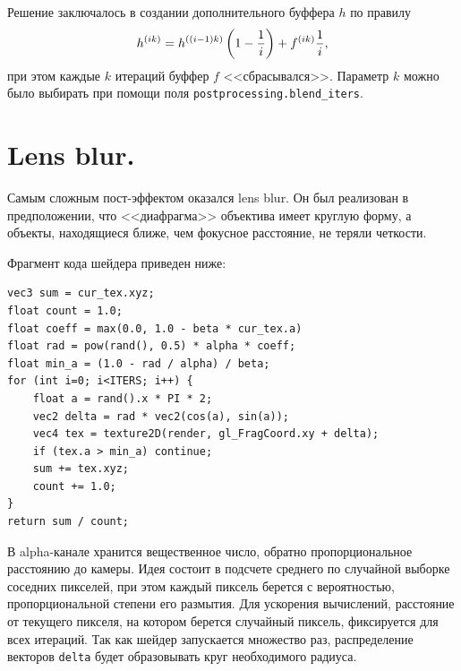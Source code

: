 Решение заключалось в создании дополнительного буффера $h$ по правилу
$$h^{(ik)} = h^{((i - 1)k)} \left(1 - \frac{1}{i}\right) + f^{(ik)}\frac{1}{i},$$
при этом каждые $k$ итераций буффер $f$ <<сбрасывался>>.
Параметр $k$ можно было выбирать при помощи поля \texttt{postprocessing.blend\_iters}.

\section{Lens blur.}

Самым сложным пост-эффектом оказался lens blur. Он был реализован в предположении, что <<диафрагма>> объектива имеет круглую форму, а объекты, находящиеся ближе, чем фокусное расстояние, не теряли четкости.

Фрагмент кода шейдера приведен ниже:
\begin{verbatim}
vec3 sum = cur_tex.xyz;
float count = 1.0;
float coeff = max(0.0, 1.0 - beta * cur_tex.a)
float rad = pow(rand(), 0.5) * alpha * coeff;
float min_a = (1.0 - rad / alpha) / beta;
for (int i=0; i<ITERS; i++) {
    float a = rand().x * PI * 2;
    vec2 delta = rad * vec2(cos(a), sin(a));
    vec4 tex = texture2D(render, gl_FragCoord.xy + delta);
    if (tex.a > min_a) continue;
    sum += tex.xyz;
    count += 1.0;
}
return sum / count;
\end{verbatim}
В alpha-канале хранится вещественное число, обратно пропорциональное расстоянию до камеры. Идея состоит в подсчете среднего по случайной выборке соседних пикселей, при этом каждый пиксель берется с вероятностью, пропорциональной степени его размытия. Для ускорения вычислений, расстояние от текущего пикселя, на котором берется случайный пиксель, фиксируется для всех итераций. Так как шейдер запускается множество раз, распределение векторов \texttt{delta} будет образовывать круг необходимого радиуса.
